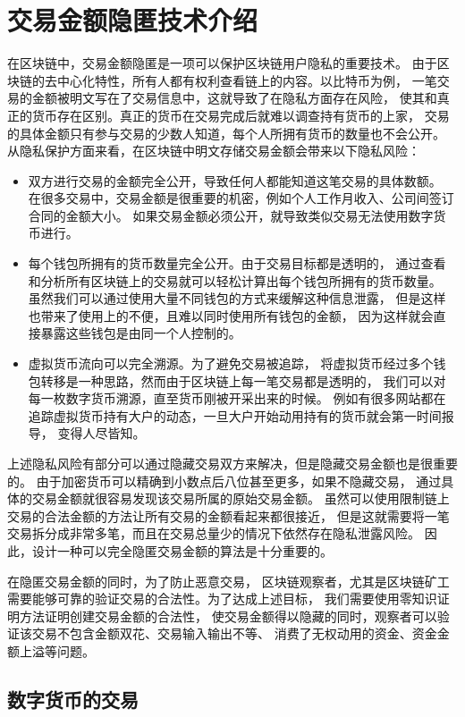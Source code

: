 \chapter{交易金额隐匿技术介绍}

在区块链中，交易金额隐匿是一项可以保护区块链用户隐私的重要技术。
由于区块链的去中心化特性，所有人都有权利查看链上的内容。以比特币为例，
一笔交易的金额被明文写在了交易信息中，这就导致了在隐私方面存在风险，
使其和真正的货币存在区别。真正的货币在交易完成后就难以调查持有货币的上家，
交易的具体金额只有参与交易的少数人知道，每个人所拥有货币的数量也不会公开。
从隐私保护方面来看，在区块链中明文存储交易金额会带来以下隐私风险：
\begin{itemize}
    \item 双方进行交易的金额完全公开，导致任何人都能知道这笔交易的具体数额。
    在很多交易中，交易金额是很重要的机密，例如个人工作月收入、公司间签订合同的金额大小。
    如果交易金额必须公开，就导致类似交易无法使用数字货币进行。
    \item 每个钱包所拥有的货币数量完全公开。由于交易目标都是透明的，
    通过查看和分析所有区块链上的交易就可以轻松计算出每个钱包所拥有的货币数量。
    虽然我们可以通过使用大量不同钱包的方式来缓解这种信息泄露，
    但是这样也带来了使用上的不便，且难以同时使用所有钱包的金额，
    因为这样就会直接暴露这些钱包是由同一个人控制的。
    \item 虚拟货币流向可以完全溯源。为了避免交易被追踪，
    将虚拟货币经过多个钱包转移是一种思路，然而由于区块链上每一笔交易都是透明的，
    我们可以对每一枚数字货币溯源，直至货币刚被开采出来的时候。
    例如有很多网站都在追踪虚拟货币持有大户的动态，一旦大户开始动用持有的货币就会第一时间报导，
    变得人尽皆知。
\end{itemize}

上述隐私风险有部分可以通过隐藏交易双方来解决，但是隐藏交易金额也是很重要的。
由于加密货币可以精确到小数点后八位甚至更多，如果不隐藏交易，
通过具体的交易金额就很容易发现该交易所属的原始交易金额。
虽然可以使用限制链上交易的合法金额的方法让所有交易的金额看起来都很接近，
但是这就需要将一笔交易拆分成非常多笔，而且在交易总量少的情况下依然存在隐私泄露风险。
因此，设计一种可以完全隐匿交易金额的算法是十分重要的。

在隐匿交易金额的同时，为了防止恶意交易，
区块链观察者，尤其是区块链矿工需要能够可靠的验证交易的合法性。为了达成上述目标，
我们需要使用零知识证明方法证明创建交易金额的合法性，
使交易金额得以隐藏的同时，观察者可以验证该交易不包含金额双花、交易输入输出不等、
消费了无权动用的资金、资金金额上溢等问题。

\section{数字货币的交易}

